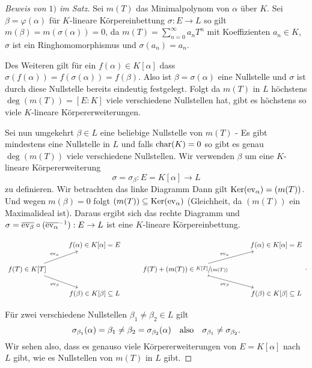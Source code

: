 \begin{proof}[Beweis von $1)$ im Satz]
	Sei $m(T)$ das Minimalpolynom von $\alpha$ über $K$. Sei $\beta = \varphi(\alpha)$ für $K$-lineare Körpereinbettung
	$\sigma: E \to L$ so gilt $m(\beta) = m(\sigma(\alpha)) = 0$, da $m(T) = \sum_{n=0}^{\infty} a_{n} T^{n}$ mit Koeffizienten $a_{n} \in K$, $\sigma$ ist ein Ringhomomorphismus
	und $\sigma(a_{n}) = a_{n}$.

	Des Weiteren gilt für ein $f(\alpha) \in K[\alpha]$ dass $\sigma(f(\alpha)) = f(\sigma(\alpha)) = f(\beta)$.
	Also ist $\beta = \sigma(\alpha)$ eine Nullstelle und $\sigma$ ist durch diese Nullstelle bereits eindeutig festgelegt.
	Folgt da $m(T)$ in $L$ höchstens $\deg(m(T)) = [E:K]$ viele verschiedene Nullstellen hat,
	gibt es höchstens so viele $K$-lineare Körpererweiterungen.

	Sei nun umgekehrt $\beta \in L$ eine beliebige Nullstelle von $m(T)$ - Es gibt mindestens eine Nullstelle in $L$ und falls
	$\operatorname{char}(K)=0$ so gibt es genau $\deg(m(T))$ viele verschiedene Nullstellen.
	Wir verwenden $\beta$ um eine $K$-lineare Körpererweiterung
	\[
		\sigma = \sigma_{\beta}: E = K[\alpha] \to L
	\] 
	zu definieren. Wir betrachten das linke Diagramm
	Dann gilt $\operatorname{Ker}(\operatorname{ev}_{\alpha}) = (m(T))$. Und wegen $m(\beta) = 0$ folgt $(m(T)) \subseteq \operatorname{Ker}(\operatorname{ev}_{\alpha})$ 
	(Gleichheit, da $(m(T))$ ein Maximalideal ist).
	Daraus ergibt sich das rechte Diagramm
	und $\sigma = \overline{\operatorname{ev}_{\beta}} \circ (\overline{\operatorname{ev}_{\alpha}}^{-1}) : E \to L$ ist eine $K$-lineare Körpereinbettung.
	
	\[
		\begin{tikzcd}
			& f(\alpha) \in K[\alpha] = E & & f(\alpha) \in K[\alpha] = E \\
			{f(T) \in K[T]} \arrow[ru, "\ev_\alpha"] \arrow[rd, "\ev_\beta"'] & & {f(T) + (m(T)) \in \sfrac{K[T]}{(m(T))}} \arrow[ru, "\ev_\alpha"] \arrow[rd, "\ev_\beta"', maps to] & \\
			 & f(\beta) \in K[\beta] \subseteq L & & f(\beta) \in K[\beta] \subseteq L
		\end{tikzcd}
	.\]
	
	Für zwei verschiedene Nullstellen $\beta_{1} \neq \beta_{2} \in L$ gilt
	\[
		\sigma_{\beta_1}(\alpha) = \beta_1 \neq  \beta_2 = \sigma_{\beta_2}(\alpha) \qq{also} \sigma_{\beta_1} \neq  \sigma_{\beta_2}
	.\] 
	Wir sehen also, dass es genauso viele Körpererweiterungen von $E = K[\alpha]$ nach $L$ gibt, wie es Nullstellen von $m(T)$ in $L$ gibt.
\end{proof}


